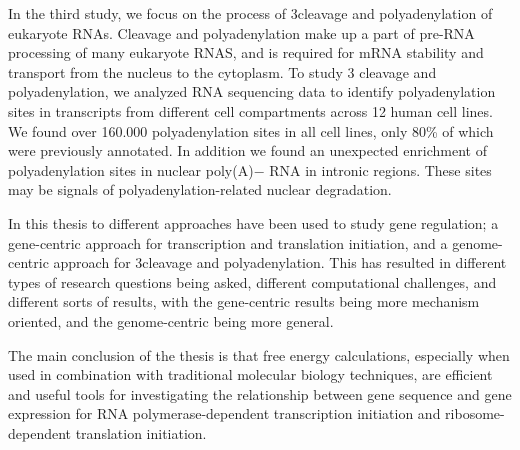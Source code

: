 In the third study, we focus on the process of 3\ppp cleavage and
polyadenylation of eukaryote RNAs. Cleavage and polyadenylation make up a part
of pre-RNA processing of many eukaryote RNAS, and is required for mRNA
stability and transport from the nucleus to the cytoplasm. To study 3\ppp
cleavage and polyadenylation, we analyzed RNA sequencing data to identify
polyadenylation sites in transcripts from different cell compartments across 12
human cell lines. We found over 160.000 polyadenylation sites in all cell
lines, only 80\% of which were previously annotated. In addition we found an
unexpected enrichment of polyadenylation sites in nuclear poly(A)$-$ RNA in
intronic regions. These sites may be signals of polyadenylation-related nuclear
degradation.

In this thesis to different approaches have been used to study gene regulation;
a gene-centric approach for transcription and translation initiation, and a
genome-centric approach for 3\ppp cleavage and polyadenylation. This has
resulted in different types of research questions being asked, different
computational challenges, and different sorts of results, with the gene-centric
results being more mechanism oriented, and the genome-centric being more
general.

The main conclusion of the thesis is that free energy calculations, especially
when used in combination with traditional molecular biology techniques, are
efficient and useful tools for investigating the relationship between gene
sequence and gene expression for RNA polymerase-dependent transcription
initiation and ribosome-dependent translation initiation.

